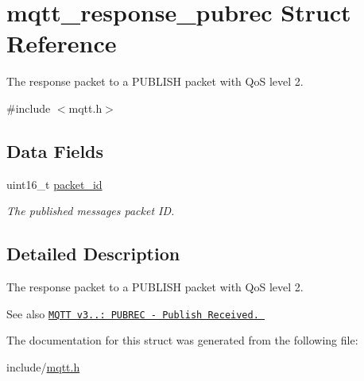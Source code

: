 \hypertarget{structmqtt__response__pubrec}{}\section{mqtt\+\_\+response\+\_\+pubrec Struct Reference}
\label{structmqtt__response__pubrec}


The response packet to a P\+U\+B\+L\+I\+SH packet with QoS level 2.  




{\ttfamily \#include $<$mqtt.\+h$>$}

\subsection*{Data Fields}
\begin{DoxyCompactItemize}
\item 
uint16\+\_\+t \hyperlink{structmqtt__response__pubrec_ae90f060b13d3cbd7388ae04762c081d5}{packet\+\_\+id}\hypertarget{structmqtt__response__pubrec_ae90f060b13d3cbd7388ae04762c081d5}{}\label{structmqtt__response__pubrec_ae90f060b13d3cbd7388ae04762c081d5}

\begin{DoxyCompactList}\small\item\em The published messages packet ID. \end{DoxyCompactList}\end{DoxyCompactItemize}


\subsection{Detailed Description}
The response packet to a P\+U\+B\+L\+I\+SH packet with QoS level 2. 

\begin{DoxySeeAlso}{See also}
\href{http://docs.oasis-open.org/mqtt/mqtt/v3.1.1/os/mqtt-v3.1.1-os.html#_Toc398718048}{\tt M\+Q\+TT v3..\+: P\+U\+B\+R\+EC -\/ Publish Received. } 
\end{DoxySeeAlso}


The documentation for this struct was generated from the following file\+:\begin{DoxyCompactItemize}
\item 
include/\hyperlink{mqtt_8h}{mqtt.\+h}\end{DoxyCompactItemize}
